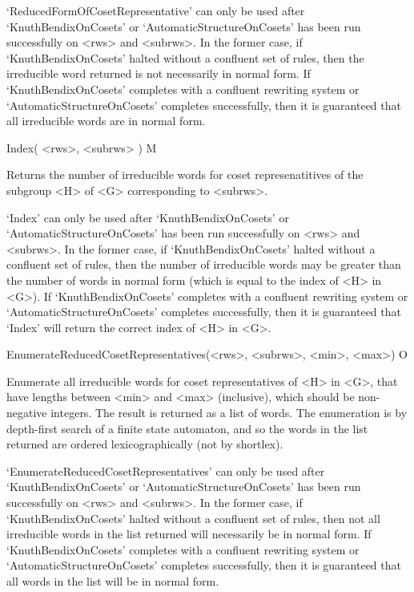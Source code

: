 `ReducedFormOfCosetRepresentative' can only be used after
`KnuthBendixOnCosets' or `AutomaticStructureOnCosets' has been run
successfully on <rws> and <subrws>.
In the former case, if  `KnuthBendixOnCosets' halted
without  a confluent  set of  rules, then the   irreducible word returned is 
not necessarily in  normal   form.  If `KnuthBendixOnCosets'  completes  
with  a confluent rewriting  system or  `AutomaticStructureOnCosets' 
completes  successfully, then it  is guaranteed that all irreducible words are
in normal form.


\>Index( <rws>, <subrws> ) M

Returns the number of irreducible words for coset represenatitives of the
subgroup <H> of <G> corresponding to <subrws>.

`Index'   can only be  used  after `KnuthBendixOnCosets'  or
`AutomaticStructureOnCosets' has been run
successfully  on <rws> and <subrws>.
In  the former case, if  `KnuthBendixOnCosets' halted without a
confluent  set of rules, then the  number of  irreducible words may be
greater than the number of words in normal form (which is equal to the
index  of <H> in <G>).  If `KnuthBendixOnCosets'  completes with a
confluent rewriting system  or `AutomaticStructureOnCosets' completes
successfully, then
it is  guaranteed that `Index' will  return the correct index of <H>
in <G>.


\medskip
\>EnumerateReducedCosetRepresentatives(<rws>, <subrws>, <min>, <max>) O

Enumerate  all  irreducible words for coset representatives of <H> in <G>,
that have   lengths between <min> and <max>    (inclusive), which should be
non-negative integers.    The result is returned  as  a list of words.
The enumeration is by depth-first search  of a finite state automaton,
and so  the words in the  list returned  are ordered lexicographically
(not by shortlex).

`EnumerateReducedCosetRepresentatives' can only be used after
`KnuthBendixOnCosets' or `AutomaticStructureOnCosets' has been run
successfully on <rws> and <subrws>.
In  the former case,  if `KnuthBendixOnCosets' halted  without a
confluent set of  rules, then not all irreducible   words in the  list
returned will necessarily be in normal form.
If `KnuthBendixOnCosets' completes with a
confluent rewriting  system or `AutomaticStructureOnCosets'
completes successfully, then
it is guaranteed that all words in the list will be in normal form.

